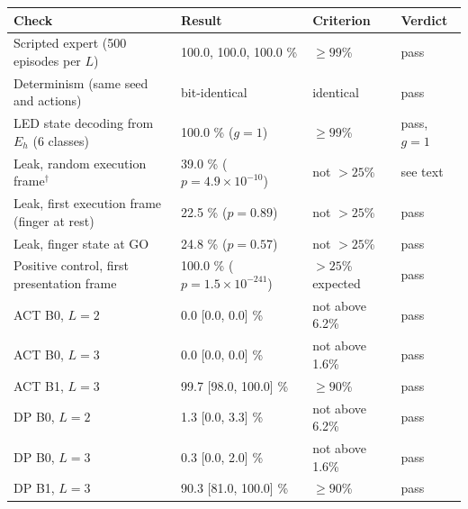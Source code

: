 \begin{tabular}{llll}
\toprule
Check & Result & Criterion & Verdict \\
\midrule
Scripted expert (500 episodes per $L$) & 100.0, 100.0, 100.0 \% & $\geq 99$\% & pass \\
Determinism (same seed and actions) & bit-identical & identical & pass \\
LED state decoding from $E_h$ (6 classes) & 100.0 \% ($g=1$) & $\geq 99$\% & pass, $g=1$ \\
Leak, random execution frame$^\dagger$ & 39.0 \% ($p=4.9\times10^{-10}$) & not $>25$\% & see text \\
Leak, first execution frame (finger at rest) & 22.5 \% ($p=0.89$) & not $>25$\% & pass \\
Leak, finger state at GO & 24.8 \% ($p=0.57$) & not $>25$\% & pass \\
Positive control, first presentation frame & 100.0 \% ($p=1.5\times10^{-241}$) & $>25$\% expected & pass \\
ACT B0, $L=2$ & 0.0 [0.0, 0.0] \% & not above 6.2\% & pass \\
ACT B0, $L=3$ & 0.0 [0.0, 0.0] \% & not above 1.6\% & pass \\
ACT B1, $L=3$ & 99.7 [98.0, 100.0] \% & $\geq 90$\% & pass \\
DP B0, $L=2$ & 1.3 [0.0, 3.3] \% & not above 6.2\% & pass \\
DP B0, $L=3$ & 0.3 [0.0, 2.0] \% & not above 1.6\% & pass \\
DP B1, $L=3$ & 90.3 [81.0, 100.0] \% & $\geq 90$\% & pass \\
\bottomrule
\end{tabular}
